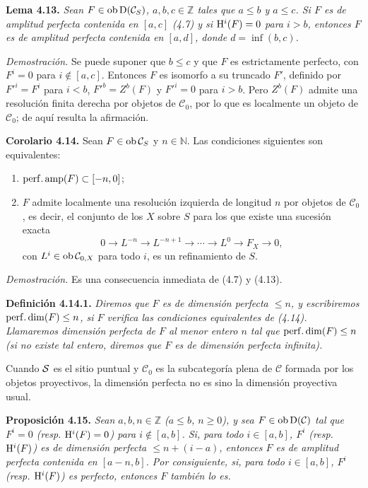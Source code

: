 \textbf{Lema 4.13.} \emph{Sean \(F\in\Ob\Dpx(\mathcal C_S)\), \(a,b,c\in\mathbb Z\) tales que \(a\leq b\) y \(a\leq c\). Si \(F\) es de amplitud perfecta contenida en \([a,c]\) (4.7) y si \(\Ho^i(F)=0\) para \(i>b\), entonces \(F\) es de amplitud perfecta contenida en \([a,d]\), donde \(d=\inf(b,c)\).}

\emph{Demostración.} Se puede suponer que \(b\leq c\) y que \(F\) es estrictamente perfecto, con \(F^i=0\) para \(i\notin[a,c]\). Entonces \(F\) es isomorfo a su truncado \(F'\), definido por \(F'^i=F^i\) para \(i<b\), \(F'^b=Z^b(F)\) y \(F'^i=0\) para \(i>b\). Pero \(Z^b(F)\) admite una resolución finita derecha por objetos de \(\mathcal C_0\), por lo que es localmente un objeto de \(\mathcal C_0\); de aquí resulta la afirmación.

\textbf{Corolario 4.14.} Sean \(F\in\Ob\mathcal C_S\) y \(n\in\mathbb N\). Las condiciones siguientes son equivalentes:
\begin{enumerate}[label=(\roman*)]
\item \(\perfamp(F)\subset[-n,0]\);
\item \(F\) admite localmente una resolución izquierda de longitud \(n\) por objetos de \(\mathcal C_0\), es decir, el conjunto de los \(X\) sobre \(S\) para los que existe una sucesión exacta
\[
  0\longrightarrow L^{-n}\longrightarrow L^{-n+1}\longrightarrow \cdots
  \longrightarrow L^0\longrightarrow F_X\longrightarrow 0,
\]
con \(L^i\in\Ob\mathcal C_{0,X}\) para todo \(i\), es un refinamiento de \(S\).
\end{enumerate}

\emph{Demostración.} Es una consecuencia inmediata de (4.7) y (4.13).

\textbf{Definición 4.14.1.} \emph{Diremos que \(F\) es de dimensión perfecta \(\leq n\), y escribiremos \(\perfdim(F)\leq n\), si \(F\) verifica las condiciones equivalentes de (4.14). Llamaremos dimensión perfecta de \(F\) al menor entero \(n\) tal que \(\perfdim(F)\leq n\) (si no existe tal entero, diremos que \(F\) es de dimensión perfecta infinita).}

Cuando \(\sisi{S}{\mathcal S}\) es el sitio puntual y \(\mathcal C_0\) es la subcategoría plena de \(\mathcal C\) formada por los objetos proyectivos, la dimensión perfecta no es sino la dimensión proyectiva usual.

\textbf{Proposición 4.15.} \emph{Sean \(a,b,n\in\mathbb Z\) (\(a\leq b\), \(n\geq0\)), y sea \(F\in\Ob\Dpx(\mathcal C)\) tal que \(F^i=0\) (resp. \(\Ho^i(F)=0\)) para \(i\notin[a,b]\). Si, para todo \(i\in[a,b]\), \(F^i\) (resp. \(\Ho^i(F)\)) es de dimensión perfecta \(\leq n+(i-a)\), entonces \(F\) es de amplitud perfecta contenida en \([a-n,b]\). Por consiguiente, si, para todo \(i\in[a,b]\), \(F^i\) (resp. \(\Ho^i(F)\)) es perfecto, entonces \(F\) también lo es.}

